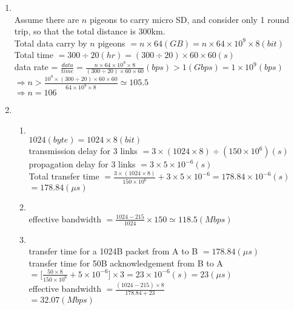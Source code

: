 \documentclass[10pt, a4paper]{article}
\begin{document}
\begin{enumerate}
\item\mbox{}\\
    Assume there are $n$ pigeons to carry micro SD, and consider only 1 round trip, so that the total distance is 300km.\\
    Total data carry by $n$ pigeons $= n \times 64 (GB) = n \times 64 \times 10^9 \times 8 (bit)$\\
    Total time $= 300 \div 20 (hr) = (300 \div 20) \times 60 \times 60 (s)$\\
    data rate = $\frac{data}{time} = \frac{n \times 64 \times 10^9 \times 8}{(300 \div 20) \times 60 \times 60} (bps) > 1 (Gbps) = 1 \times 10^9 (bps)$\\
    $\Rightarrow n > \frac{10^9 \times (300 \div 20) \times 60 \times 60}{64 \times 10^9 \times 8} \simeq 105.5$\\
    $\Rightarrow n = 106$
\item
    \begin{enumerate}
    \item\mbox{}\\
        $1024 (byte) = 1024 \times 8 (bit)$\\
        transmission delay for 3 links $= 3 \times (1024 \times 8) \div (150 \times 10^6) (s)$\\
        propagation delay for 3 links $= 3 \times 5 \times 10^{-6} (s)$\\
        Total transfer time $= \frac{3 \times (1024 \times 8)}{150 \times 10^6} + 3 \times 5 \times 10^{-6} = 178.84 \times 10^{-6} (s)$\\
        $= 178.84 (\mu s)$
    \item\mbox{}\\
        effective bandwidth $= \frac{1024 - 215}{1024} \times 150 \simeq 118.5 (Mbps)$
    \item\mbox{}\\
        transfer time for a 1024B packet from A to B $= 178.84 (\mu s)$\\
        transfer time for 50B acknowledgement from B to A $= \lbrack\frac{50 \times 8}{150 \times 10^6} + 5 \times 10^{-6}\rbrack \times 3 = 23 \times 10^{-6} (s) = 23 (\mu s)$\\
        effective bandwidth $= \frac{\left(1024 - 215\right) \times 8}{178.84 + 23}$\\
        $= 32.07 (Mbps)$
    \end{enumerate}


\end{enumerate}
\end{document}
